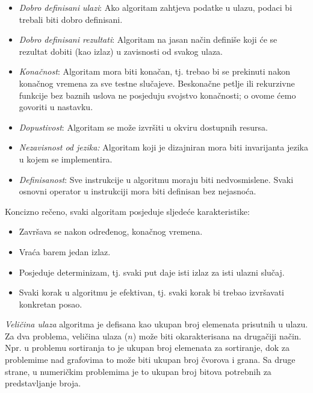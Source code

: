 \begin{itemize}
    \item    \textit{Dobro definisani ulazi}: Ako algoritam zahtjeva podatke u ulazu, podaci bi trebali biti dobro definisani. 
    \item \textit{Dobro definisani rezultati}: Algoritam na jasan način definiše koji će se rezultat dobiti (kao izlaz) u zavisnosti od svakog ulaza. %
    \item    \textit{Konačnost}: Algoritam mora biti konačan, tj. trebao bi se prekinuti nakon konačnog vremena za sve testne slučajeve. Beskonačne petlje ili rekurzivne funkcije bez baznih uslova ne posjeduju svojstvo konačnosti; o ovome ćemo govoriti u nastavku.  
    \item  \textit{Dopustivost}: Algoritam  se može izvršiti u okviru dostupnih resursa.  %
      \item \textit{Nezavisnost od jezika:} Algoritam koji je dizajniran mora biti invarija\-nta jezika u kojem se implementira.
      \item   \textit{Definisanost}: Sve instrukcije u algoritmu moraju biti nedvosmislene. Svaki osnovni operator u instrukciji mora biti definisan bez   nejasnoća.        
\end{itemize}
Koncizno rečeno, svaki algoritam posjeduje sljedeće karakteristike:  
\begin{itemize}
	\item Završava se nakon određenog, konačnog vremena.
    \item Vraća barem jedan izlaz.
    \item Posjeduje determinizam, tj. svaki put daje isti izlaz za isti ulazni slučaj.
    \item Svaki korak u algoritmu je efektivan, tj. svaki korak bi trebao izvršavati konkretan posao.
\end{itemize}

\textit{Veličina ulaza} algoritma je defisana kao ukupan broj elemenata prisutnih u ulazu. Za dva problema, veličina ulaza ($n$) može biti okarakterisana na drugačiji način.  Npr.  u problemu sortiranja to  je ukupan broj elemenata za sortiranje, dok za problemime nad grafovima to može biti  ukupan broj čvorova i grana. Sa druge strane,  u numeričkim problemima je to ukupan broj bitova potrebnih za predstavljanje broja. 

